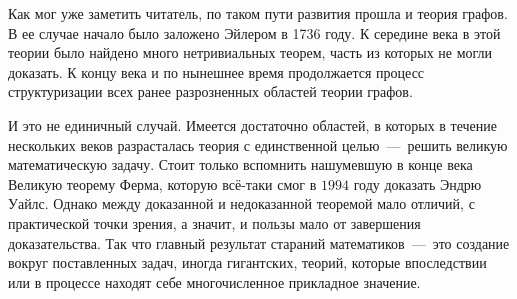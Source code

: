 	Как мог уже заметить читатель, по таком пути развития прошла и теория графов. В ее случае начало было заложено Эйлером в 1736 году. 
	К середине  века в этой теории было найдено много нетривиальных теорем, часть из которых не могли доказать. 
	К концу  века и по нынешнее время продолжается процесс структуризации всех ранее разрозненных областей теории графов.

	И это не единичный случай. Имеется достаточно областей, в которых в течение нескольких веков разрасталась теория с 
	единственной целью~---~решить великую математическую задачу. Стоит только вспомнить нашумевшую в конце  века 
	Великую теорему Ферма, которую всё-таки смог в $1994$ году доказать Эндрю Уайлс. Однако между доказанной и недоказанной 
	теоремой мало отличий, с практической точки зрения, а значит, и пользы мало от завершения доказательства. Так что главный 
	результат стараний математиков~---~это создание вокруг поставленных задач, иногда гигантских, теорий, которые впоследствии 
	или в процессе находят себе многочисленное прикладное значение.
	
